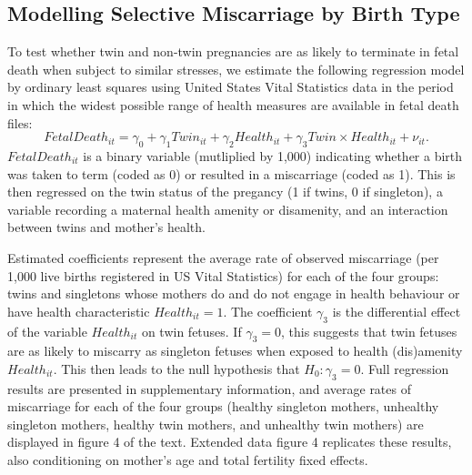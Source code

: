 \documentclass{nature}
\begin{document}
\begin{linenumbers}
\subsection{Modelling Selective Miscarriage by Birth Type}
To test whether twin and non-twin pregnancies are as likely to terminate in fetal death when subject to similar stresses, we estimate the following regression model by ordinary least squares using United States Vital Statistics data in the period in which the widest possible range of health measures are available in fetal death files:
\begin{equation}
FetalDeath_{it} = \gamma_0 + \gamma_1 Twin_{it} + \gamma_2 Health_{it} + \gamma_3 Twin\times Health_{it} + \nu_{it}.
\end{equation}
$FetalDeath_{it}$ is a binary variable (mutliplied by 1,000) indicating whether a birth was taken to term (coded as 0) or resulted in a miscarriage (coded as 1).  This is then regressed on the twin status of the pregancy (1 if twins, 0 if singleton), a variable recording a maternal health amenity or disamenity, and an interaction between twins and mother's health.

Estimated coefficients represent the average rate of observed miscarriage (per 1,000 live births registered in US Vital Statistics) for each of the four groups: twins and singletons whose mothers do and do not engage in health behaviour or have health characteristic $Health_{it}=1$. The coefficient $\gamma_3$ is the differential effect of the variable $Health_{it}$ on twin fetuses.  If $\gamma_3=0$, this suggests that twin fetuses are as likely to miscarry as singleton fetuses when exposed to health (dis)amenity $Health_{it}$.  This then leads to the null hypothesis that $H_0: \gamma_3=0$. Full regression results are presented in supplementary information, and average rates of miscarriage for each of the four groups (healthy singleton mothers, unhealthy singleton mothers, healthy twin mothers, and unhealthy twin mothers) are displayed in figure 4 of the text.  Extended data figure 4 replicates these results, also conditioning on mother's age and total fertility fixed effects.




\end{linenumbers}
\end{document}
